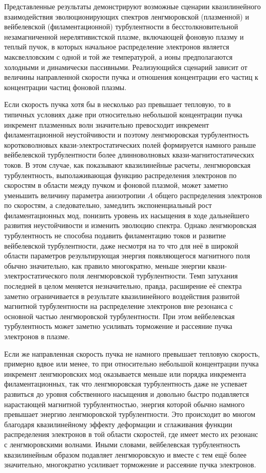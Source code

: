 Представленные результаты демонстрируют возможные сценарии квазилинейного взаимодействия эволюционирующих спектров ленгмюровской (плазменной) и вейбелевской (филаментационной) турбулентности в бесстолкновительной незамагниченной нерелятивистской плазме, включающей фоновую плазму и теплый пучок, в которых начальное распределение электронов является максвелловским с одной и той же температурой, а ионы предполагаются холодными и динамически пассивными. Реализующийся сценарий зависит от величины направленной скорости пучка и отношения концентрации его частиц к концентрации частиц фоновой плазмы. 

Если скорость пучка хотя бы в несколько раз превышает тепловую, то в типичных условиях даже при относительно небольшой концентрации пучка инкремент плазменных волн значительно превосходит инкремент филаментационной неустойчивости и поэтому ленгмюровская турбулентность коротковолновых квази-электростатических полей формируется намного раньше вейбелевской турбулентности более длинноволновых квази-магнитостатических токов. В этом случае, как показывают квазилинейные расчеты, ленгмюровская турбулентность, выполаживающая функцию распределения электронов по скоростям в области между пучком и фоновой плазмой, может заметно уменьшить величину параметра анизотропии $A$ общего распределения электронов по скоростям, а следовательно, замедлить экспоненциальный рост филаментационных мод, понизить уровень их насыщения в ходе дальнейшего развития неустойчивости и изменить эволюцию спектра. Однако ленгмюровская турбулентность не способна подавить филаментацию токов и развитие вейбелевской турбулентности, даже несмотря на то что для неё в широкой области параметров результирующая энергия появляющегося магнитного поля обычно значительно, как правило многократно, меньше энергии квази-электростатического поля ленгмюровской турбулентности. Темп затухания последней в целом меняется незначительно, правда, расширение её спектра заметно ограничивается в результате квазилинейного воздействия развитой магнитной турбулентности на распределение электронов вне резонанса с основной частью ленгмюровской турбулентности. При этом вейбелевская турбулентность может заметно усиливать торможение и рассеяние пучка электронов в плазме.

Если же направленная скорость пучка не намного превышает тепловую скорость, примерно вдвое или менее, то при относительно небольшой концентрации пучка инкремент ленгмюровских мод оказывается меньше или порядка инкремента филаментационных, так что ленгмюровская турбулентность даже не успевает развиться до уровня собственного насыщения и довольно быстро подавляется нарастающей магнитной турбулентностью, энергия которой обычно намного превышает энергию ленгмюровской турбулентности. Это происходит во многом благодаря квазилинейному эффекту деформации и сглаживания функции распределения электронов в той области скоростей, где имеет место их резонанс с ленгмюровскими волнами. Иными словами, вейбелевская турбулентность квазилинейным образом подавляет ленгмюровскую и вместе с тем ещё более значительно, многократно усиливает торможение и рассеяние пучка электронов.

